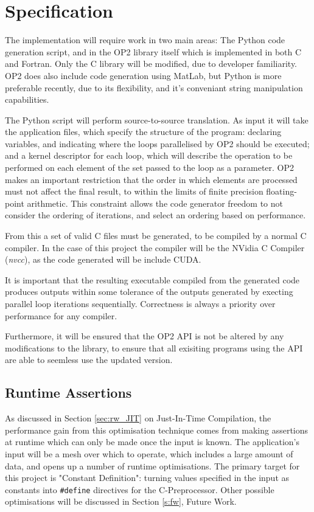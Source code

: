 
\section{Specification}
\label{s:spec}
The implementation will require work in two main areas: The Python code generation script, and in the OP2 library itself which is implemented in both C and Fortran. Only the C library will be modified, due to developer familiarity. OP2 does also include code generation using MatLab, but Python is more preferable recently, due to its flexibility, and it's conveniant string manipulation capabilities.
\par
The Python script will perform source-to-source translation. As input it will take the application files, which specify the structure of the program: declaring variables, and indicating where the loops parallelised by OP2 should be executed; and a kernel descriptor for each loop, which will describe the operation to be performed on each element of the set passed to the loop as a parameter. OP2 makes an important restriction that the order in which elements are processed must not affect the final result, to within the limits of finite precision floating-point arithmetic\cite[p3]{op2main}. This constraint allows the code generator freedom to not consider the ordering of iterations, and select an ordering based on performance.
\par
From this a set of valid C files must be generated, to be compiled by a normal C compiler. In the case of this project the compiler will be the NVidia C Compiler (\textit{nvcc}), as the code generated will be include CUDA.
\par
It is important that the resulting executable compiled from the generated code produces outputs within some tolerance of the outputs generated by execting parallel loop iterations sequentially. Correctness is always a priority over performance for any compiler.
\par
Furthermore, it will be ensured that the OP2 API is not be altered by any modifications to the library, to ensure that all exisiting programs using the API are able to seemless use the updated version.

\subsection{Runtime Assertions}
As discussed in Section \ref{sec:rw_JIT} on Just-In-Time Compilation, the performance gain from this optimisation technique comes from making assertions at runtime which can only be made once the input is known. The application's input will be a mesh over which to operate, which includes a large amount of data, and opens up a number of runtime optimisations. The primary target for this project is "Constant Definition": turning values specified in the input as constants into \verb|#define| directives for the C-Preprocessor. Other possible optimisations will be discussed in Section \ref{s:fw}, Future Work.


